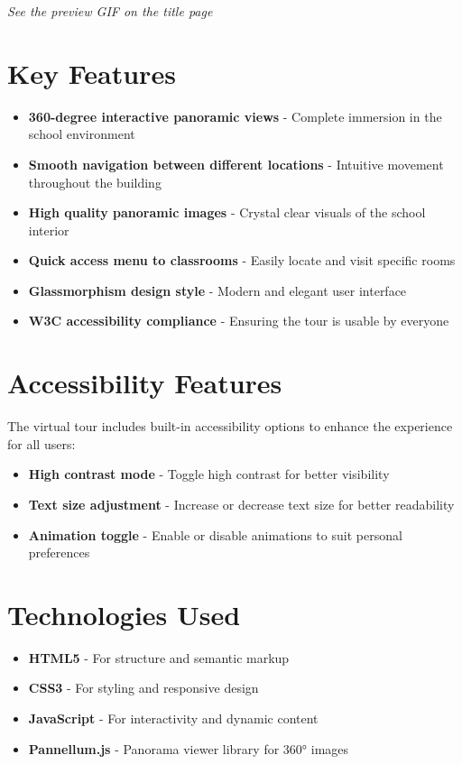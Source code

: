 \documentclass[11pt,a4paper]{article}
\begin{document}
\begin{center}
\textit{See the preview GIF on the title page}
\end{center}

\section{Key Features}
\begin{itemize}[leftmargin=*]
    \item \textbf{360-degree interactive panoramic views} - Complete immersion in the school environment
    \item \textbf{Smooth navigation between different locations} - Intuitive movement throughout the building
    \item \textbf{High quality panoramic images} - Crystal clear visuals of the school interior
    \item \textbf{Quick access menu to classrooms} - Easily locate and visit specific rooms
    \item \textbf{Glassmorphism design style} - Modern and elegant user interface
    \item \textbf{W3C accessibility compliance} - Ensuring the tour is usable by everyone
\end{itemize}

\section{Accessibility Features}
The virtual tour includes built-in accessibility options to enhance the experience for all users:
\begin{itemize}[leftmargin=*]
    \item \textbf{High contrast mode} - Toggle high contrast for better visibility
    \item \textbf{Text size adjustment} - Increase or decrease text size for better readability
    \item \textbf{Animation toggle} - Enable or disable animations to suit personal preferences
\end{itemize}

\section{Technologies Used}
\begin{itemize}[leftmargin=*]
    \item \textbf{HTML5} - For structure and semantic markup
    \item \textbf{CSS3} - For styling and responsive design
    \item \textbf{JavaScript} - For interactivity and dynamic content
    \item \textbf{Pannellum.js} - Panorama viewer library for 360° images
\end{itemize}
\end{document}
